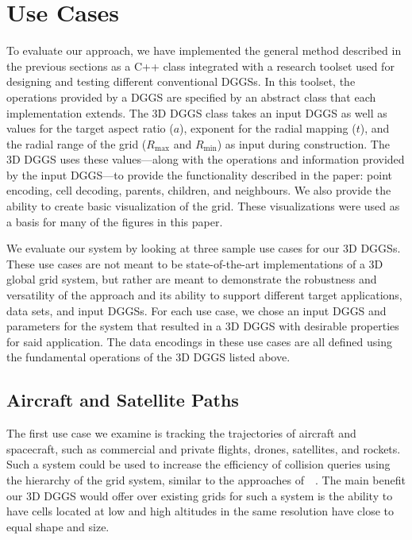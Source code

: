 \chapter{Use Cases} \label{chap:usecases}
To evaluate our approach, we have implemented the general method described in the previous sections as a C++ class integrated with a research toolset used for designing and testing different conventional DGGSs.
In this toolset, the operations provided by a DGGS are specified by an abstract class that each implementation extends.
The 3D DGGS class takes an input DGGS as well as values for the target aspect ratio ($a$), exponent for the radial mapping ($t$), and the radial range of the grid ($R_\mathrm{max}$ and $R_\mathrm{min}$) as input during construction.
The 3D DGGS uses these values---along with the operations and information provided by the input DGGS---to provide the functionality described in the paper: point encoding, cell decoding, parents, children, and neighbours.
We also provide the ability to create basic visualization of the grid.
These visualizations were used as a basis for many of the figures in this paper.


We evaluate our system by looking at three sample use cases for our 3D DGGSs.
These use cases are not meant to be state-of-the-art implementations of a 3D global grid system, but rather are meant to demonstrate the robustness and versatility of the approach and its ability to support different target applications, data sets, and input DGGSs.
For each use case, we chose an input DGGS and parameters for the system that resulted in a 3D DGGS with desirable properties for said application.
The data encodings in these use cases are all defined using the fundamental operations of the 3D DGGS listed above.


\section{Aircraft and Satellite Paths}
The first use case we examine is tracking the trajectories of aircraft and spacecraft, such as commercial and private flights, drones, satellites, and rockets.
Such a system could be used to increase the efficiency of collision queries using the hierarchy of the grid system, similar to the approaches of~~\cite{miao2019low, zhai2019collision}.
The main benefit our 3D DGGS would offer over existing grids for such a system is the ability to have cells located at low and high altitudes in the same resolution have close to equal shape and size.


